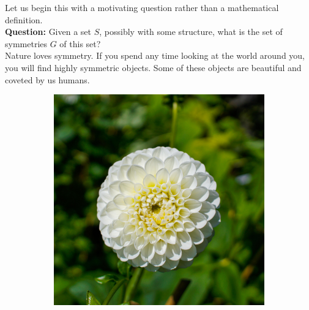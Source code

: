 \documentclass{article}
\theoremstyle{indented}
\begin{document}
Let us begin this with a motivating question rather than a mathematical definition.\\

\noindent \textbf{Question:} Given a set $S$, possibly with some structure, what is the set of symmetries $G$ of this set?\\

Nature loves symmetry. If you spend any time looking at the world around you, you will find highly symmetric objects. Some of these objects are beautiful and coveted by us humans.

\begin{figure}[H]
    \centering
\begin{subfigure}[b]{0.3\textwidth}
    \includegraphics[width=\textwidth]{symmetric_flower.jpg}
\end{subfigure}
\qquad \qquad \qquad
\begin{subfigure}[b]{0.3\textwidth}

\end{subfigure}
\end{figure}
\end{document}
